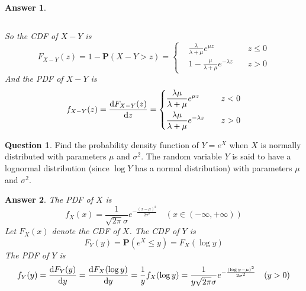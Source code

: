 \documentclass[utf8]{article}
\theoremstyle{definition}%
\newtheorem{question}{Question} %
\theoremstyle{plain}%
\newtheorem{answer}{Answer} %
\begin{document}
\begin{answer}
\begin{enumerate}[label=(\alph*)]
\begin{equation}
            \end{equation}
    \end{enumerate}
    So the CDF of $X - Y$ is
    \begin{equation}
        F_{X - Y}(z) = 1 - \mathbf{P}(X - Y > z) = \left\{\begin{aligned}
            &\frac{\lambda}{\lambda + \mu} e^{\mu z} \quad &z \leq 0 \\
            &1 - \frac{\mu}{\lambda + \mu} e^{-\lambda z} \quad &z > 0
        \end{aligned}\right.
    \end{equation}
    And the PDF of $X - Y$ is
    \begin{equation}
        f_{X - Y}(z) = \dv{F_{X - Y}(z)}{z} = \left\{\begin{aligned}
            &\frac{\lambda\mu}{\lambda + \mu} e^{\mu z} \quad &z < 0 \\
            &\frac{\lambda\mu}{\lambda + \mu} e^{-\lambda z} \quad &z > 0
        \end{aligned}\right.
    \end{equation}
\end{answer}

\begin{question}
    Find the probability density function of $Y = e^X$ when $X$ is normally distributed with parameters $\mu$ and $\sigma^2$. The random variable $Y$ is said to have a lognormal distribution (since $\log Y$ has a normal distribution) with parameters $\mu$ and $\sigma^2$.
\end{question}
\begin{answer}
    The PDF of $X$ is
    \begin{equation}
        f_{X}(x) = \frac{1}{\sqrt{2\pi}\sigma} e^{-\frac{(x - \mu)^2}{2\sigma^2}} \quad (x \in (-\infty, +\infty))
    \end{equation}
    Let $F_{X}(x)$ denote the CDF of $X$. The CDF of $Y$ is
    \begin{equation}
        F_{Y}(y) = \mathbf{P}(e^X \leq y) = F_{X}(\log y)
    \end{equation}
    The PDF of $Y$ is
    \begin{equation}
        f_{Y}(y) = \dv{F_{Y}(y)}{y} = \dv{F_{X}(\log y)}{y} = \frac{1}{y} f_{X}(\log y) = \frac{1}{y\sqrt{2\pi}\sigma} e^{-\frac{(\log y - \mu)^2}{2\sigma^2}} \quad (y > 0)
    \end{equation}
\end{answer}
\end{document}
